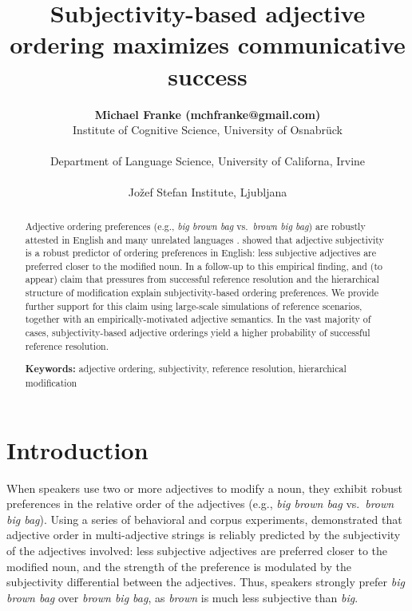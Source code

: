 \documentclass[10pt,a4paper]{article}
\title{Subjectivity-based adjective ordering maximizes communicative success}
\author{{\large \bf Michael Franke (mchfranke@gmail.com)} \\
  Institute of Cognitive Science, University of Osnabr\"uck \\
  \AND {\large \bf Gregory Scontras (gscontra@uci.edu)} \\
  Department of Language Science, University of Californa, Irvine \\
  \AND {\large \bf Mihael Simoni\v{c} (smihael@gmail.com)}  \\
  Jo\v{z}ef Stefan Institute, Ljubljana}
\begin{document}
\maketitle

\begin{abstract}
  
Adjective ordering preferences (e.g., \emph{big brown bag} vs.~\emph{brown big bag}) are robustly attested in English and many unrelated languages \cite{dixon1982}.  showed that adjective subjectivity is a robust predictor of ordering preferences in English: less subjective adjectives are preferred closer to the modified noun. In a follow-up to this empirical finding,  and \citeauthor{scontrasetalSPadjectives} (to appear) claim that pressures from successful reference resolution and the hierarchical structure of modification explain subjectivity-based ordering preferences. We provide further support for this claim using large-scale simulations of reference scenarios, together with an empirically-motivated adjective semantics. In the vast majority of cases, subjectivity-based adjective orderings yield a higher probability of successful reference resolution.

\textbf{Keywords:} 
adjective ordering, subjectivity, reference resolution, hierarchical modification

\end{abstract}

\section{Introduction}

When speakers use two or more adjectives to modify a noun, they exhibit robust preferences in the relative order of the adjectives (e.g., \emph{big brown bag} vs.~\emph{brown big bag}). Using a series of behavioral and corpus experiments,  demonstrated that adjective order in multi-adjective strings is reliably predicted by the subjectivity of the adjectives involved: less subjective adjectives are preferred closer to the modified noun, and the strength of the preference is modulated by the subjectivity differential between the adjectives. Thus, speakers strongly prefer \emph{big brown bag} over \emph{brown big bag}, as \emph{brown} is much less subjective than \emph{big}.
\end{document}
